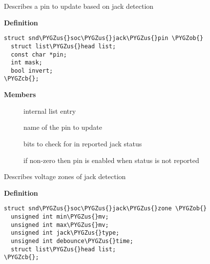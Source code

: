 \documentclass[a4paper,8pt,english]{sphinxmanual}
\def\PYGZus{\char`\_}
\def\PYGZob{\char`\{}
\def\PYGZcb{\char`\}}
\begin{document}
\begin{fulllineitems}
\label{sound/kernel-api/alsa-driver-api:c.snd_soc_jack_pin}
Describes a pin to update based on jack detection

\end{fulllineitems}


\textbf{Definition}

\begin{Verbatim}[commandchars=\\\{\}]
struct snd\PYGZus{}soc\PYGZus{}jack\PYGZus{}pin \PYGZob{}
  struct list\PYGZus{}head list;
  const char *pin;
  int mask;
  bool invert;
\PYGZcb{};
\end{Verbatim}

\textbf{Members}
\begin{description}
\item[{}] \leavevmode
internal list entry

\item[{}] \leavevmode
name of the pin to update

\item[{}] \leavevmode
bits to check for in reported jack status

\item[{}] \leavevmode
if non-zero then pin is enabled when status is not reported

\end{description}

\begin{fulllineitems}
\label{sound/kernel-api/alsa-driver-api:c.snd_soc_jack_zone}
Describes voltage zones of jack detection

\end{fulllineitems}


\textbf{Definition}

\begin{Verbatim}[commandchars=\\\{\}]
struct snd\PYGZus{}soc\PYGZus{}jack\PYGZus{}zone \PYGZob{}
  unsigned int min\PYGZus{}mv;
  unsigned int max\PYGZus{}mv;
  unsigned int jack\PYGZus{}type;
  unsigned int debounce\PYGZus{}time;
  struct list\PYGZus{}head list;
\PYGZcb{};
\end{Verbatim}
\end{document}
